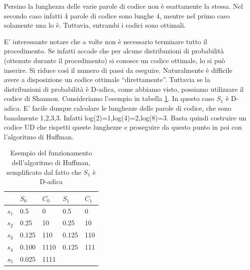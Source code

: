 Persino la lunghezza delle varie parole di codice non è esattamente la stessa. Nel secondo caso infatti 4 parole di codice sono lunghe 4, mentre nel primo caso solamente una lo è. Tuttavia, entrambi i codici sono ottimali.

E' interessante notare che a volte non è necessario terminare tutto il procedimento. Se infatti accade che per alcune distribuzioni di probabilità (ottenute durante il procedimento) si conosce un codice ottimale, lo si può inserire. Si riduce così il numero di passi da 
eseguire. Naturalmente è difficile avere a disposizione un codice ottimale ``direttamente''. Tuttavia se la distribuzioni di probabilità è D-adica, come abbiamo visto, possiamo utilizzare il codice di Shannon.
Consideriamo l'esempio in tabella \ref{tab:huffman3}. In questo caso $S_1$ è D-adica.
E' facile dunque calcolare le lunghezze delle parole di codice, che sono banalmente 1,2,3,3. Infatti 
log(2)=1,log(4)=2,log(8)=3. Basta quindi costruire un codice UD che rispetti queste lunghezze e proseguire da questo punto in poi con l'algoritmo di Huffman.

\begin{table}[htbp]
  \begin{center}
   \begin{tabular}{l|| l|l|| l|l}
	 & $S_0$ & $C_0$  & $S_1$ & $C_1$\\
       \hline
	$s_1$ & 0.5 & 0     & 0.5 & 0 \\ 
	$s_2$ & 0.25 & 10    & 0.25 & 10 \\ 
	$s_3$ & 0.125 & 110   & 0.125 & 110\\ 
        $s_4$ & 0.100 & 1110  & $\boxed{0.125}$ & 111 \\ 
        $s_5$ & 0.025 & 1111 &  &   \\ 
    \end{tabular}
     
     \caption{Esempio del funzionamento dell'algoritmo di Huffman, semplificato dal fatto che $S_1$ è D-adica}
    \label{tab:huffman3}
  \end{center}
\end{table}


